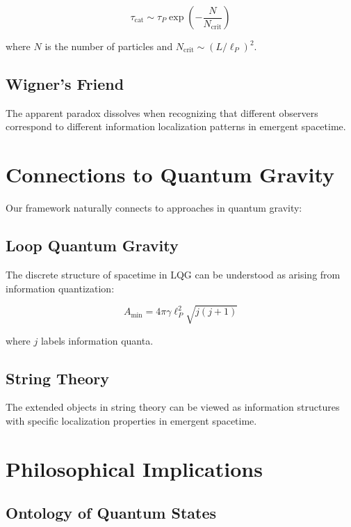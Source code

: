 \documentclass[12pt,a4paper]{article}
\theoremstyle{definition}
\begin{document}
\begin{equation}
\tau_{\text{cat}} \sim \tau_P \exp\left(-\frac{N}{N_{\text{crit}}}\right)
\end{equation}

where $N$ is the number of particles and $N_{\text{crit}} \sim (L/\ell_P)^2$.

\subsection{Wigner's Friend}

The apparent paradox dissolves when recognizing that different observers correspond to different information localization patterns in emergent spacetime.

\section{Connections to Quantum Gravity}

Our framework naturally connects to approaches in quantum gravity:

\subsection{Loop Quantum Gravity}

The discrete structure of spacetime in LQG can be understood as arising from information quantization:

\begin{equation}
A_{\text{min}} = 4\pi\gamma\ell_P^2\sqrt{j(j+1)}
\end{equation}

where $j$ labels information quanta.

\subsection{String Theory}

The extended objects in string theory can be viewed as information structures with specific localization properties in emergent spacetime.

\section{Philosophical Implications}

\subsection{Ontology of Quantum States}
\end{document}
